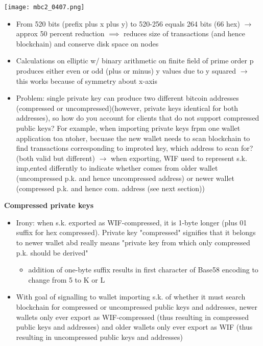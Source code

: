 \documentclass[english, 11pt]{article}
\begin{document}
\begin{minipage}{0.3\linewidth}
    \texttt{[image: mbc2\_0407.png]} 
\end{minipage}\hfil
\begin{minipage}{0.35\linewidth}
\begin{itemize}
    \item From 520 bits (prefix plus x plus y) to 520-256 equals 264 bits (66 hex) $\rightarrow$ approx 50 percent reduction $\implies$ reduces size of transactions (and hence blockchain) and conserve disk space on nodes
    \item Calculations on elliptic w/ binary arithmetic on finite field of prime order p produces either even or odd (plus or minus) y values due to y squared $\rightarrow$ this works because of symmetry about x-axis
\end{itemize}
\end{minipage}
\begin{itemize}
    \item Problem: single private key can produce two different bitcoin addresses (compressed or uncompressed)(however, private keys identical for both addresses), so how do you account for clients that do not support compressed public keys? For example, when importing private keys frpm one wallet application toa ntoher, becuase the new wallet needs to scan blockchain to find transactions corresponding to improted key, which address to scan for? (both valid but different) $\rightarrow$ when exporting, WIF used to represent s.k. imp,ented differntly to indicate whether comes from older wallet (uncompressed p.k. and hence uncompressed address) or newer wallet (compressed p.k. and hence com. address (see next section))
\end{itemize}
\textbf{Compressed private keys}
\begin{itemize}
    \item Irony: when s.k. exported as WIF-compressed, it is 1-byte longer (plus 01 suffix for hex compressed). Private key "compressed" signifies that it belongs to newer wallet abd really means "private key from which only compressed p.k. should be derived"
    \begin{itemize}
        \item addition of one-byte suffix results in first character of Base58 encoding to change from 5 to K or L
    \end{itemize}
    \item With goal of signalling to wallet importing s.k. of whether it must search blockchain for compressed or uncompressed public keys and addresses, newer wallets only ever export as WIF-compressed (thus resulting in compressed public keys and addresses) and older wallets only ever export as WIF (thus resulting in uncompressed public keys and addresses)
\end{itemize}
\end{document}
